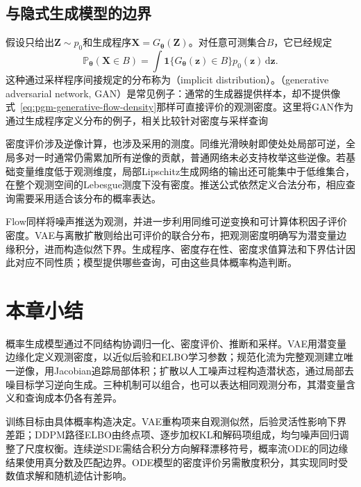 \subsection{与隐式生成模型的边界}
\label{sec:pgm-generative-implicit-boundary}

假设只给出$\bm{Z}\sim p_0$和生成程序$\bm{X}=G_{\bm{\theta}}(\bm{Z})$。对任意可测集合$B$，它已经规定
\begin{equation}
  \label{eq:pgm-generative-pushforward}
  \mathbb{P}_{\bm{\theta}}(\bm{X}\in B)
  =\int \mathbf{1}\{G_{\bm{\theta}}(\bm{z})\in B\}
           p_0(\bm{z})\,\mathrm{d}\bm{z}.
\end{equation}
这种通过采样程序间接规定的分布称为（implicit distribution）。（generative adversarial network, GAN）是常见例子：通常的生成器提供样本，却不提供像式~\eqref{eq:pgm-generative-flow-density}那样可直接评价的观测密度。这里将GAN作为通过生成程序定义分布的例子，相关比较针对密度与采样查询

密度评价涉及逆像计算，也涉及采用的测度。同维光滑映射即使处处局部可逆，全局多对一时通常仍需累加所有逆像的贡献，普通网络未必支持枚举这些逆像。若基础变量维度低于观测维度，局部Lipschitz生成网络的输出还可能集中于低维集合，在整个观测空间的Lebesgue测度下没有密度。推送公式依然定义合法分布，相应查询需要采用适合该分布的概率表达。

Flow同样将噪声推送为观测，并进一步利用同维可逆变换和可计算体积因子评价密度。VAE与离散扩散则给出可评价的联合分布，把观测密度明确写为潜变量边缘积分，进而构造似然下界。生成程序、密度存在性、密度求值算法和下界估计因此对应不同性质；模型提供哪些查询，可由这些具体概率构造判断。

\section{本章小结}
\label{sec:pgm-generative-summary}

概率生成模型通过不同结构协调归一化、密度评价、推断和采样。VAE用潜变量边缘化定义观测密度，以近似后验和ELBO学习参数；规范化流为完整观测建立唯一逆像，用Jacobian追踪局部体积；扩散以人工噪声过程构造潜状态，通过局部去噪目标学习逆向生成。三种机制可以组合，也可以表达相同观测分布，其潜变量含义和查询成本仍各有差异。

训练目标由具体概率构造决定。VAE重构项来自观测似然，后验灵活性影响下界差距；DDPM路径ELBO由终点项、逐步加权KL和解码项组成，均匀噪声回归调整了尺度权衡。连续逆SDE需结合积分方向解释漂移符号，概率流ODE的同边缘结果使用真分数及匹配边界。ODE模型的密度评价另需散度积分，其实现同时受数值求解和随机迹估计影响。

